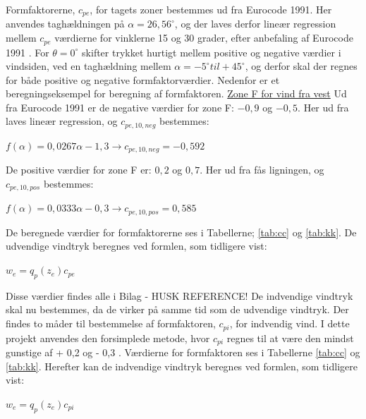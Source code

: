 Formfaktorerne, $c_{pe}$, for tagets zoner bestemmes ud fra Eurocode 1991. Her anvendes taghældningen på $\alpha = 26,\!56^{\circ}$, og der laves derfor lineær regression mellem $c_{pe}$ værdierne for vinklerne 15 og 30 grader, efter anbefaling af Eurocode 1991 \citep[ tabel 7.4a kapitel 7.2.5]{EU91}. For $\theta = 0^{\circ}$ skifter trykket hurtigt mellem positive og negative værdier i vindsiden, ved en taghældning mellem $\alpha = -5^{\circ} til + 45^{\circ}$, og derfor skal der regnes for både positive og negative formfaktorværdier. 
\newline \indent{     }  Nedenfor er et beregningseksempel for beregning af formfaktoren.
\newline
\newline
\underline{Zone F for vind fra vest}
\newline
Ud fra Eurocode 1991 \citep[ tabel 7.4a kapitel 7.2.5]{EU91} er de negative værdier for zone F: $-0,\!9$ og $-0,\!5$. Her ud fra laves lineær regression, og $c_{pe,10,neg}$ bestemmes:
\begin{center}
	$f(\alpha)=0,\!0267\alpha - 1,\!3 \to c_{pe,10,neg}=-0,\!592$
\end{center}
De positive værdier for zone F er: $0,\!2$ og $0,\!7$. Her ud fra fås ligningen, og $c_{pe,10,pos}$ bestemmes:
\begin{center}
	$f(\alpha)=0,\!0333\alpha - 0,\!3 \to c_{pe,10,pos}=0,\!585$
\end{center}

De beregnede værdier for formfaktorerne ses i Tabellerne; \ref{tab:cc} og \ref{tab:kk}. 
\newline
\newline
De udvendige vindtryk beregnes ved formlen, som tidligere vist:
\begin{center} 
	$w_e=q_p(z_e)c_{pe}$
\end{center}
Disse værdier findes alle i Bilag - HUSK REFERENCE! 
\newline
\newline
De indvendige vindtryk skal nu bestemmes, da de virker på samme tid som de udvendige vindtryk.
\newline
\newline
Der findes to måder til bestemmelse af formfaktoren, $c_{pi}$, for indvendig vind. I dette projekt anvendes den forsimplede metode, hvor $c_{pi}$ regnes til at være den mindst gunstige af + 0,2 og - 0,3 \citep[Kapitel 7]{EU91}. Værdierne for formfaktoren ses i Tabellerne \ref{tab:cc} og \ref{tab:kk}.
\newline
\newline
Herefter kan de indvendige vindtryk beregnes ved formlen, som tidligere vist:
\begin{center} 
	$w_e=q_p(z_e)c_{pi}$
\end{center}

